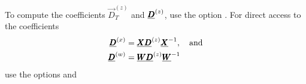 To compute the coefficients $\Vec{D}_T^{(z)}$ and $\underline{\pmb{D}}^{(z)}$, use the option . For direct access to the coefficients
\begin{equation}
    \begin{split}
        \underline{\pmb{D}}^{(x)} &= \underline{\pmb{X}} \underline{\pmb{D}}^{(z)} \underline{\pmb{X}}^{-1}, \quad \text{and} \\
        \underline{\pmb{D}}^{(w)} &= \underline{\pmb{W}} \underline{\pmb{D}}^{(z)} \underline{\pmb{W}}^{-1}
    \end{split}
\end{equation}
use the options  and 